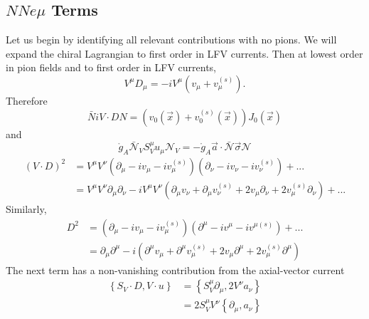 \documentclass{book}[12pt]
\begin{document}
\subsection{$NN e\mu$ Terms}
Let us begin by identifying all relevant contributions with no pions. We will expand the chiral Lagrangian to first order in LFV currents. Then at lowest order in pion fields and to first order in LFV currents,
\begin{equation}
V^{\mu}D_{\mu}=-iV^{\mu}\left(v_{\mu}+v_{\mu}^{(s)}\right).
\end{equation}
Therefore
\begin{equation}
\bar{N}i V\cdot D N=\left(v_0(\vec{x})+v_0^{(s)}(\vec{x})\right)J_0(\vec{x})
\end{equation}
and
\begin{equation}
\mathring{g}_A\bar{\mathcal{N}}_VS_V^{\mu}u_{\mu}\mathcal{N}_V=-\mathring{g}_A\vec{a}\cdot \bar{\mathcal{N}}\vec{\sigma}\mathcal{N}
\end{equation}
\begin{equation}
\begin{split}
(V\cdot D)^2 &= V^{\mu}V^{\nu}\left(\partial_{\mu}-iv_{\mu}-iv_{\mu}^{(s)}\right)\left(\partial_{\nu}-iv_{\nu}-iv_{\nu}^{(s)}\right)+...\\
&=V^{\mu}V^{\nu}\partial_{\mu}\partial_{\nu}-iV^{\mu}V^{\nu}\left(\partial_{\mu}v_{\nu}+\partial_{\mu}v_{\nu}^{(s)}+2v_{\mu}\partial_{\nu}+2v_{\mu}^{(s)}\partial_{\nu}\right)+...
\end{split}
\end{equation}
Similarly,
\begin{equation}
\begin{split}
D^2&=\left(\partial_{\mu}-iv_{\mu}-iv_{\mu}^{(s)}\right)\left(\partial^{\mu}-iv^{\mu}-iv^{\mu(s)}\right)+...\\
&=\partial_{\mu}\partial^{\mu}-i\left(\partial^{\mu}v_{\mu}+\partial^{\mu}v_{\mu}^{(s)}+2v_{\mu}\partial^{\mu}+2v_{\mu}^{(s)}\partial^{\mu}\right)
\end{split}
\end{equation}
The next term has a non-vanishing contribution from the axial-vector current
\begin{equation}
\begin{split}
\left\{S_V\cdot D,V\cdot u\right\}&=\left\{S_V^{\mu}\partial_{\mu},2V^{\nu}a_{\nu}\right\}\\
&=2S_V^{\mu}V^{\nu}\left\{\partial_{\mu},a_{\nu}\right\}
\end{split}
\end{equation}
\end{document}
